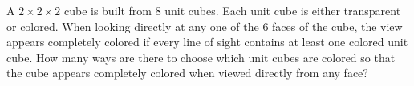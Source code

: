 A \(2\times 2\times 2\) cube is built from \(8\) unit cubes. Each unit cube is either transparent or colored. When looking directly at any one of the \(6\) faces of the cube, the view appears completely colored if every line of sight contains at least one colored unit cube. How many ways are there to choose which unit cubes are colored so that the cube appears completely colored when viewed directly from any face?
